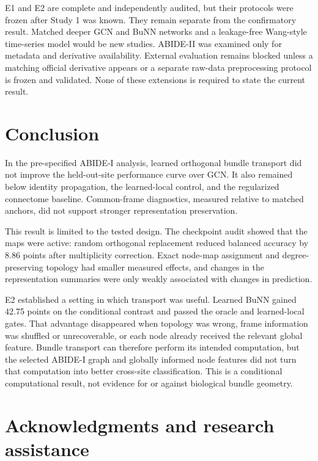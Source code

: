 \documentclass[11pt,a4paper]{article}
\begin{document}
E1 and E2 are complete and independently audited, but their protocols were
frozen after Study 1 was known. They remain separate from the confirmatory
result. Matched deeper GCN and BuNN networks and a leakage-free Wang-style
time-series model would be new studies. ABIDE-II was examined only for metadata
and derivative availability. External evaluation remains blocked unless a
matching official derivative appears or a separate raw-data preprocessing
protocol is frozen and validated. None of these extensions is required to
state the current result.

\section{Conclusion}

In the pre-specified ABIDE-I analysis, learned orthogonal bundle transport did
not improve the held-out-site performance curve over GCN. It also remained
below identity propagation, the learned-local control, and the regularized
connectome baseline. Common-frame diagnostics, measured relative to matched
anchors, did not support stronger representation preservation.

This result is limited to the tested design. The checkpoint audit showed that
the maps were active: random orthogonal replacement reduced balanced accuracy
by 8.86 points after multiplicity correction. Exact node-map assignment and
degree-preserving topology had smaller measured effects, and changes in the
representation summaries were only weakly associated with changes in
prediction.

E2 established a setting in which transport was useful. Learned BuNN gained
42.75 points on the conditional contrast and passed the oracle and
learned-local gates. That advantage disappeared when topology was wrong, frame
information was shuffled or unrecoverable, or each node already received the
relevant global feature. Bundle transport can therefore perform its intended
computation, but the selected ABIDE-I graph and globally informed node features
did not turn that computation into better cross-site classification. This is a
conditional computational result, not evidence for or against biological
bundle geometry.

\section*{Acknowledgments and research assistance}
\end{document}
